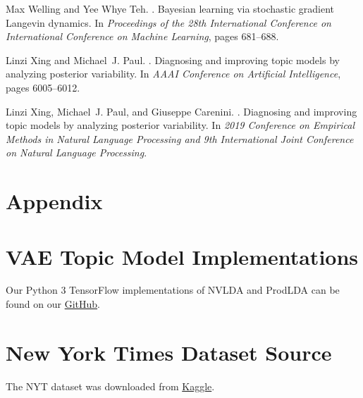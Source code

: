 \documentclass[10pt]{article}
\begin{document}
\begin{thebibliography}{}
Max Welling and Yee Whye Teh.
.
\newblock Bayesian learning via stochastic gradient Langevin dynamics.
\newblock In {\em Proceedings of the 28th International Conference on International Conference on Machine Learning}, pages 681–688.

Linzi Xing and Michael~J. Paul.
.
\newblock Diagnosing and improving topic models by analyzing posterior variability.
\newblock In {\em AAAI Conference on Artificial Intelligence}, pages 6005–6012.

Linzi Xing, Michael~J. Paul, and Giuseppe Carenini.
.
\newblock Diagnosing and improving topic models by analyzing posterior variability.
\newblock In {\em 2019 Conference on Empirical Methods in Natural Language Processing and 9th International Joint Conference on Natural Language Processing}.

\end{thebibliography}

\appendix

\section*{Appendix}

\section{VAE Topic Model Implementations}\label{sec:code}

Our Python 3 TensorFlow implementations of NVLDA and ProdLDA can be found on our \href{https://github.com/chiukenny/CPSC503-finalproject}{GitHub}.

\section{New York Times Dataset Source}\label{sec:datasource}

The NYT dataset was downloaded from \href{https://www.kaggle.com/nzalake52/new-york-times-articles}{Kaggle}.
\end{document}
